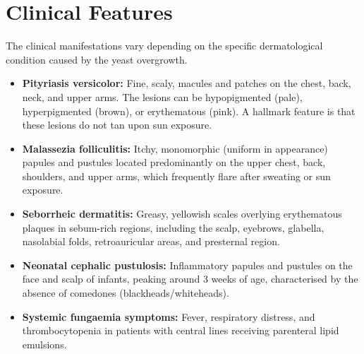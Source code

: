 \section*{Clinical Features}
The clinical manifestations vary depending on the specific dermatological condition caused by the yeast overgrowth.
\begin{itemize}
    \item \textbf{Pityriasis versicolor:} Fine, scaly, macules and patches on the chest, back, neck, and upper arms. The lesions can be hypopigmented (pale), hyperpigmented (brown), or erythematous (pink). A hallmark feature is that these lesions do not tan upon sun exposure.
    \item \textbf{Malassezia folliculitis:} Itchy, monomorphic (uniform in appearance) papules and pustules located predominantly on the upper chest, back, shoulders, and upper arms, which frequently flare after sweating or sun exposure.
    \item \textbf{Seborrheic dermatitis:} Greasy, yellowish scales overlying erythematous plaques in sebum-rich regions, including the scalp, eyebrows, glabella, nasolabial folds, retroauricular areas, and presternal region.
    \item \textbf{Neonatal cephalic pustulosis:} Inflammatory papules and pustules on the face and scalp of infants, peaking around 3 weeks of age, characterised by the absence of comedones (blackheads/whiteheads).
    \item \textbf{Systemic fungaemia symptoms:} Fever, respiratory distress, and thrombocytopenia in patients with central lines receiving parenteral lipid emulsions.
\end{itemize}

